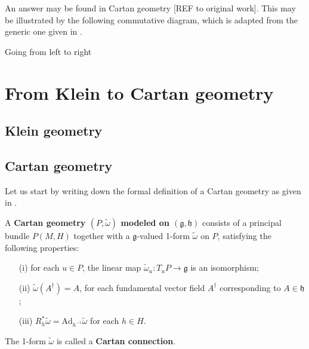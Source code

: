 \documentclass[11pt]{amsart}
\begin{document}
An answer may be found in Cartan geometry [{\blu REF to original 
	work}]. This may be illustrated by the following commutative 
diagram, which is adapted from the generic one given in
\cite{sharpe1997diff_geo,Wise:2010sm}.

Going from left to right 


\section{From Klein to Cartan geometry}

\subsection{Klein geometry}

\subsection{Cartan geometry}

Let us start by writing down the formal definition of a Cartan 
geometry as given in \cite{sharpe1997diff_geo}.

\begin{definition}
	\label{def:cartan_geo}
	A \textbf{Cartan geometry $(P,\tilde{\omega})$ modeled on 		
		$(\mathfrak{g},\mathfrak{h})$} consists of a principal 
	bundle $P(M,H)$ together with a $\mathfrak{g}$-valued 1-form 
	$\tilde{\omega}$ on $P$, satisfying the following properties:
	\begin{itemize}
		\item[(i)] for each $u \in P$, the linear map 
			$\tilde{\omega}_u : T_uP \to \mathfrak{g}$ is an 
			isomorphism;
		\item[(ii)] $\tilde{\omega}(A^\dagger) = A$, for each 
			fundamental vector field $A^\dagger$ corresponding to $A 
			\in \mathfrak{h}$;
		\item[(iii)] $R_h^\ast \tilde{\omega} = 
			\mathrm{Ad}_{h^{-1}} \tilde{\omega}$ for each $h \in H$.
	\end{itemize}
	The 1-form $\tilde{\omega}$ is called a \textbf{Cartan 
		connection}.
\end{definition}
\end{document}
